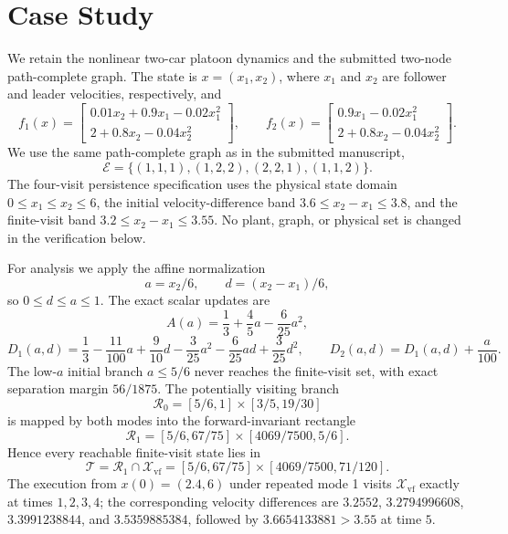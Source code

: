 \section{Case Study}\label{sec:case-study-revised}
We retain the nonlinear two-car platoon dynamics and the submitted two-node path-complete graph. The state is $x=(x_1,x_2)$, where $x_1$ and $x_2$ are follower and leader velocities, respectively, and
\[
f_1(x)=\begin{bmatrix}0.01x_2+0.9x_1-0.02x_1^2\\2+0.8x_2-0.04x_2^2\end{bmatrix},\qquad
f_2(x)=\begin{bmatrix}0.9x_1-0.02x_1^2\\2+0.8x_2-0.04x_2^2\end{bmatrix}.
\]
We use the same path-complete graph as in the submitted manuscript,
\[
\mathcal E=\{(1,1,1),(1,2,2),(2,2,1),(1,1,2)\}.
\]
The four-visit persistence specification uses the physical state domain $0\le x_1\le x_2\le6$, the initial velocity-difference band $3.6\le x_2-x_1\le3.8$, and the finite-visit band $3.2\le x_2-x_1\le3.55$. No plant, graph, or physical set is changed in the verification below.

For analysis we apply the affine normalization
\[
a=x_2/6,\qquad d=(x_2-x_1)/6,
\]
so $0\le d\le a\le1$. The exact scalar updates are
\[
A(a)=\frac13+\frac45a-\frac6{25}a^2,
\]
\[
D_1(a,d)=\frac13-\frac{11}{100}a+\frac9{10}d-\frac3{25}a^2-\frac6{25}ad+\frac3{25}d^2,
\qquad D_2(a,d)=D_1(a,d)+\frac{a}{100}.
\]
The low-$a$ initial branch $a\le5/6$ never reaches the finite-visit set, with exact separation margin $56/1875$. The potentially visiting branch
\[
\mathcal R_0=[5/6,1]\times[3/5,19/30]
\]
is mapped by both modes into the forward-invariant rectangle
\[
\mathcal R_1=[5/6,67/75]\times[4069/7500,5/6].
\]
Hence every reachable finite-visit state lies in
\[
\mathcal T=\mathcal R_1\cap\mathcal X_{\mathrm{vf}}
=[5/6,67/75]\times[4069/7500,71/120].
\]
The execution from $x(0)=(2.4,6)$ under repeated mode 1 visits $\mathcal X_{\mathrm{vf}}$ exactly at times $1,2,3,4$; the corresponding velocity differences are $3.2552$, $3.2794996608$, $3.3991238844$, and $3.5359885384$, followed by $3.6654133881>3.55$ at time $5$.

